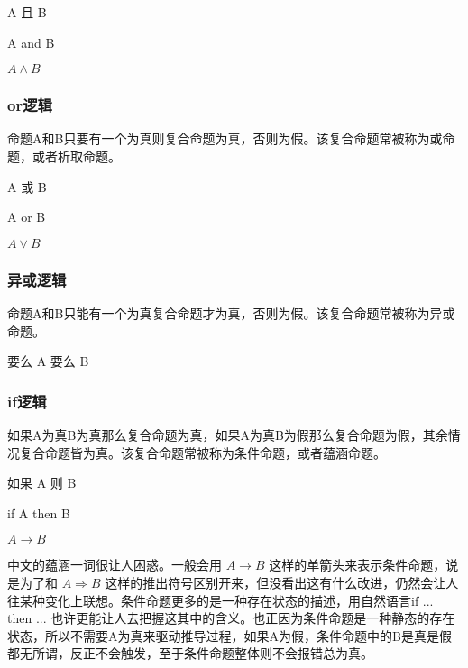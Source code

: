 \documentclass[12pt,oneside]{book}
\begin{document}
\begin{framed}
A 且 B
\end{framed}

\begin{framed}
A and B
\end{framed}

\begin{framed}
$A \wedge B$
\end{framed}

\subsubsection{or逻辑}
命题A和B只要有一个为真则复合命题为真，否则为假。该复合命题常被称为或命题，或者析取命题。

\begin{framed}
A 或 B
\end{framed}

\begin{framed}
A or B
\end{framed}

\begin{framed}
$A \vee B$
\end{framed}

\subsubsection{异或逻辑}
命题A和B只能有一个为真复合命题才为真，否则为假。该复合命题常被称为异或命题。

\begin{framed}
要么 A 要么 B
\end{framed}

\subsubsection{if逻辑}
如果A为真B为真那么复合命题为真，如果A为真B为假那么复合命题为假，其余情况复合命题皆为真。该复合命题常被称为条件命题，或者蕴涵命题。

\begin{framed}
如果 A 则 B
\end{framed}

\begin{framed}
if A then B
\end{framed}

\begin{framed}
$A \rightarrow B$
\end{framed}

中文的蕴涵一词很让人困惑。一般会用 $A \to B$ 这样的单箭头来表示条件命题，说是为了和 $A \Rightarrow B$ 这样的推出符号区别开来，但没看出这有什么改进，仍然会让人往某种变化上联想。条件命题更多的是一种存在状态的描述，用自然语言if ... then ... 也许更能让人去把握这其中的含义。也正因为条件命题是一种静态的存在状态，所以不需要A为真来驱动推导过程，如果A为假，条件命题中的B是真是假都无所谓，反正不会触发，至于条件命题整体则不会报错总为真。
\end{document}
